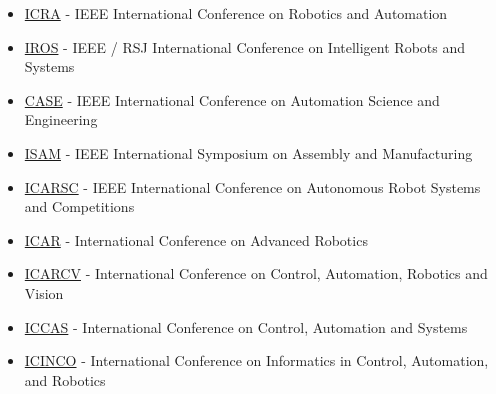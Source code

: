\begin{itemize}[leftmargin=2em]
	\item \href{http://www.ieee-ras.org/conferences-workshops/fully-sponsored/icra}{ICRA} - IEEE International Conference on Robotics and Automation
	\item \href{http://www.ieee-ras.org/conferences-workshops/financially-co-sponsored/iros}{IROS} - IEEE / RSJ International Conference on Intelligent Robots and Systems
	\item \href{http://www.ieee-ras.org/conferences-workshops/fully-sponsored/case}{CASE} - IEEE International Conference on Automation Science and Engineering
	\item \href{http://www.ieee-ras.org/conferences-workshops/fully-sponsored/isam}{ISAM} - IEEE International Symposium on Assembly and Manufacturing
	\item \href{http://www.ieee-ras.org/conferences-workshops/technically-co-sponsored/robotica}{ICARSC} - IEEE International Conference on Autonomous Robot Systems and Competitions
	\item \href{http://www.ieee-ras.org/conferences-workshops/technically-co-sponsored/icar}{ICAR} - International Conference on Advanced Robotics
	\item \href{http://www.ieee-ras.org/conferences-workshops/technically-co-sponsored/icarcv}{ICARCV} - International Conference on Control, Automation, Robotics and Vision 
	\item \href{http://www.ieee-ras.org/conferences-workshops/technically-co-sponsored/iccas}{ICCAS} - International Conference on Control, Automation and Systems
	\item \href{http://www.ieee-ras.org/conferences-workshops/technically-co-sponsored/icinco}{ICINCO} - International Conference on Informatics in Control, Automation, and Robotics
\end{itemize}


